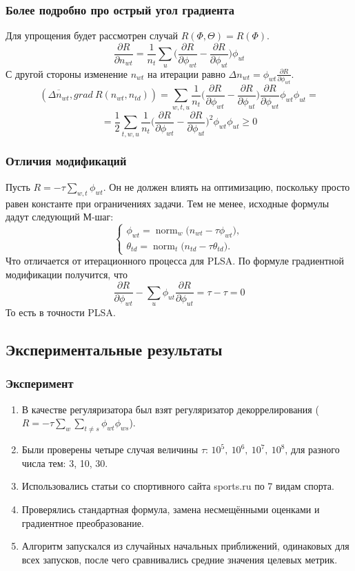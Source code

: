 \documentclass[utf8]{beamer}
\DeclareMathOperator{\norm}{norm}
\begin{document}
\begin{frame}
		\frametitle{Более подробно про острый угол градиента}

Для упрощения будет рассмотрен случай $R(\Phi, \Theta) = R(\Phi)$.
\[
\frac{\partial{R}}{\partial{n_{wt}}}  = \frac{1}{n_t} \sum_{u} \bigg(\frac{\partial{R}}{\partial{\phi_{wt}}}  -  \frac{\partial{R}}{\partial{\phi_{ut}}} \bigg)  \phi_{ut}
\]
С другой стороны изменение $n_{wt}$ на итерации равно $ \Delta n_{wt} =  \phi_{wt} \frac{\partial{R}}{\partial{\phi_{wt}}}$.
\[
(\overline{\Delta n_{wt}}, grad\ R(n_{wt}, n_{td})) = \sum\limits_{w, t, u}  \frac{1}{n_{t}}  \bigg(  \frac{\partial{R}}{\partial{\phi_{wt}}}  -  \frac{\partial{R}}{\partial{\phi_{ut}}}  \bigg)  \frac{\partial{R}}{\partial{\phi_{wt}}} \phi_{wt} \phi_{ut}  = 
\]
\[
= \frac12  \sum\limits_{t, w, u}  \frac{1}{n_{t}} \bigg(  \frac{\partial{R}}{\partial{\phi_{wt}}}  -  \frac{\partial{R}}{\partial{\phi_{ut}}}  \bigg)^2 \phi_{wt} \phi_{ut}  \geq 0
\]
	\end{frame}

\begin{frame}
		\frametitle{Отличия модификаций}
Пусть $R = -\tau \sum_{w, t} \phi_{wt}$. Он не должен влиять на оптимизацию, поскольку просто равен константе при ограничениях задачи. Тем не менее, исходные формулы дадут следующий М-шаг:
\[
\left\{
	\begin{aligned}
		\phi_{wt} = \norm_w \big( n_{wt} - \tau \phi_{wt}\big),\\
		\theta_{td} = \norm_t \big( n_{td} - \tau \theta_{td}\big).
	\end{aligned}
\right.
\]
Что отличается от итерационного процесса для  PLSA. По формуле градиентной модификации получится, что 
\[
\frac{\partial{R}}{\partial{\phi_{wt}}} - \sum\limits_u \phi_{ut} \frac{\partial{R}}{\partial{\phi_{ut}}} = \tau - \tau =0
\]
То есть в точности PLSA.
	\end{frame}

	\subsection{Экспериментальные результаты}
	
	\begin{frame}
		\frametitle{Эксперимент}
		
\begin{enumerate}
\item В качестве регуляризатора был взят регуляризатор декоррелирования ($R = -\tau\sum\limits_w \sum\limits_{t \neq s} \phi_{wt} \phi_{ws}$).
\item Были проверены четыре случая величины $\tau$: $10^5,~10^6,~10^7,~10^8$, для разного числа тем: 3, 10, 30.
\item Использовались статьи со спортивного сайта sports.ru по 7 видам спорта.
\item Проверялись стандартная формула, замена несмещёнными оценками и градиентное преобразование.
\item Алгоритм  запускался из случайных начальных приближений, одинаковых для всех запусков, после чего сравнивались средние значения целевых метрик.
\end{enumerate}

	\end{frame}
\end{document}
